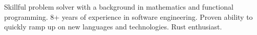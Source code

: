 

\begin{cvparagraph}

Skillful problem solver with a background in mathematics and
  functional programming.  8+ years of experience in
  software engineering.  Proven ability to quickly ramp up on new
  languages and technologies. Rust enthusiast.
\end{cvparagraph}
